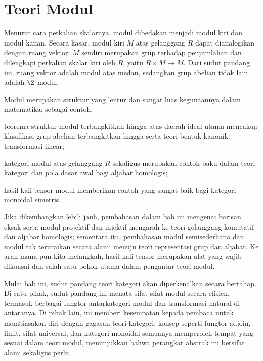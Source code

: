 
\chapter{Teori Modul}\label{sec:modules}
Menurut cara perkalian skalarnya, modul dibedakan menjadi modul kiri dan modul kanan. Secara kasar, modul kiri $M$ atas gelanggang $R$ dapat dianalogikan dengan ruang vektor: $M$ sendiri merupakan grup terhadap penjumlahan dan dilengkapi perkalian skalar kiri oleh $R$, yaitu $R \times M \to M$. Dari sudut pandang ini, ruang vektor adalah modul atas medan, sedangkan grup abelian tidak lain adalah $\Z$-modul.

Modul merupakan struktur yang lentur dan sangat luas kegunaannya dalam matematika; sebagai contoh,
\begin{inparaenum}[(a)]
	\item teorema struktur modul terbangkitkan hingga atas daerah ideal utama mencakup klasifikasi grup abelian terbangkitkan hingga serta teori bentuk kanonik transformasi linear;
	\item kategori modul atas gelanggang $R$ sekaligus merupakan contoh baku dalam teori kategori dan pola dasar awal bagi aljabar homologis;
	\item hasil kali tensor modul memberikan contoh yang sangat baik bagi kategori monoidal simetris.
\end{inparaenum}
Jika dikembangkan lebih jauh, pembahasan dalam bab ini mengenai barisan eksak serta modul projektif dan injektif mengarah ke teori gelanggang komutatif dan aljabar homologis; sementara itu, pembahasan modul semisederhana dan modul tak teruraikan secara alami menuju teori representasi grup dan aljabar. Ke arah mana pun kita melangkah, hasil kali tensor merupakan alat yang wajib dikuasai dan salah satu pokok utama dalam pengantar teori modul.

Mulai bab ini, sudut pandang teori kategori akan diperkenalkan secara bertahap. Di satu pihak, sudut pandang ini menata sifat-sifat modul secara efisien, termasuk berbagai fungtor antarkategori modul dan transformasi natural di antaranya. Di pihak lain, ini memberi kesempatan kepada pembaca untuk membiasakan diri dengan gagasan teori kategori: konsep seperti fungtor adjoin, limit, sifat universal, dan kategori monoidal semuanya memperoleh tempat yang sesuai dalam teori modul, menunjukkan bahwa perangkat abstrak ini bersifat alami sekaligus perlu.


